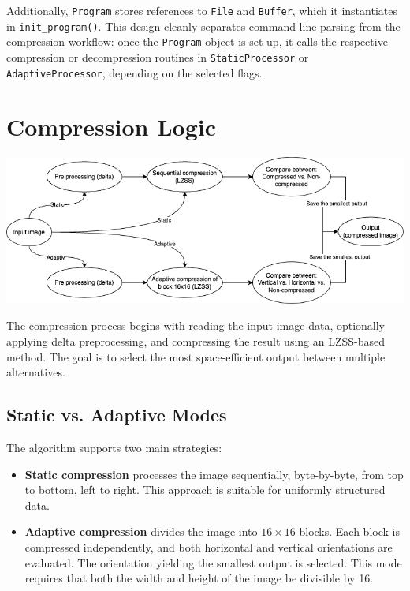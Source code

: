 \documentclass[a4paper,12pt]{article}
\begin{document}
    Additionally, \texttt{Program} stores references to \texttt{File} and \texttt{Buffer}, which it instantiates in \texttt{init\_program()}. This design cleanly separates command-line parsing from the compression workflow: once the \texttt{Program} object is set up, it calls the respective compression or decompression routines in \texttt{StaticProcessor} or \texttt{AdaptiveProcessor}, depending on the selected flags.




    \section{Compression Logic}

    \includegraphics[width=1\textwidth]{template-fig/compressor}\par\vspace{1cm}

    The compression process begins with reading the input image data, optionally applying delta preprocessing, and compressing the result using an LZSS-based method. The goal is to select the most space-efficient output between multiple alternatives.

    \subsection*{Static vs. Adaptive Modes}

    The algorithm supports two main strategies:

    \begin{itemize}
        \item \textbf{Static compression} processes the image sequentially, byte-by-byte, from top to bottom, left to right. This approach is suitable for uniformly structured data.

        \item \textbf{Adaptive compression} divides the image into $16 \times 16$ blocks. Each block is compressed independently, and both horizontal and vertical orientations are evaluated. The orientation yielding the smallest output is selected. This mode requires that both the width and height of the image be divisible by 16.
    \end{itemize}
\end{document}
